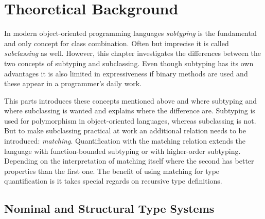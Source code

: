 \chapter{Theoretical Background}
\label{ctr:theoreticalBackground}
In modern object-oriented programming languages \emph{subtyping} is the
fundamental and only concept for class combination.  Often but imprecise it is called
\emph{subclassing} as well. However, this chapter investigates the
differences between the two concepts of subtyping and subclassing. Even though
subtyping has its own advantages it is also limited in expressiveness
if binary methods are used and these appear in a programmer's daily work.

This parts introduces these concepts mentioned above and where subtyping
and where subclassing is wanted and explains where the difference are.
Subtyping is used for polymorphism in object-oriented languages,
whereas subclassing is not. But to make subclassing practical at work
an additional relation needs to be introduced: \emph{matching}. Quantification
with the matching relation extends the language with function-bounded subtyping
or with higher-order subtyping. Depending on the interpretation of matching
itself where the second has better properties than the first one. The benefit
of using matching for type quantification is it takes special regards on
recursive type definitions.

\section{Nominal and Structural Type Systems}


